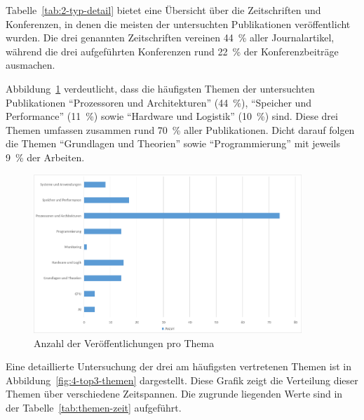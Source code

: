 Tabelle~\ref{tab:2-typ-detail} bietet eine Übersicht über die Zeitschriften und Konferenzen, in denen die meisten der untersuchten Publikationen veröffentlicht wurden. Die drei genannten Zeitschriften vereinen 44~\% aller Journalartikel, während die drei aufgeführten Konferenzen rund 22~\% der Konferenzbeiträge ausmachen.

Abbildung~\ref{fig:3-anzahl-themen} verdeutlicht, dass die häufigsten Themen der untersuchten Publikationen \enquote{Prozessoren und Architekturen} (44~\%), \enquote{Speicher und Performance} (11~\%) sowie \enquote{Hardware und Logistik} (10~\%) sind. Diese drei Themen umfassen zusammen rund 70~\% aller Publikationen. Dicht darauf folgen die Themen \enquote{Grundlagen und Theorien} sowie \enquote{Programmierung} mit jeweils 9~\% der Arbeiten.

\begin{figure}[!h]
    \centering
    \includegraphics[width=0.90\textwidth]{graphics/3-anzahl-themen.png}
    \caption{Anzahl der Veröffentlichungen pro Thema}
    \label{fig:3-anzahl-themen}
\end{figure}

Eine detaillierte Untersuchung der drei am häufigsten vertretenen Themen ist in Abbildung~\ref{fig:4-top3-themen} dargestellt. Diese Grafik zeigt die Verteilung dieser Themen über verschiedene Zeitspannen. Die zugrunde liegenden Werte sind in der Tabelle~\ref{tab:themen-zeit} aufgeführt.

